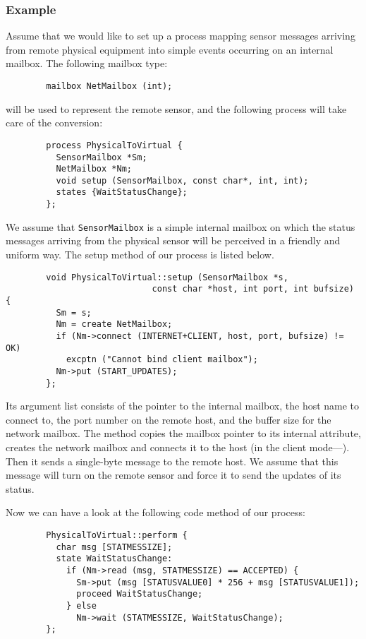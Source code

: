 \subsubsection*{Example}

\noindent
Assume that we would like to set up a process mapping sensor messages arriving
from remote physical equipment into simple events occurring
on an internal mailbox.
The following mailbox type:
\begin{verbatim}
        mailbox NetMailbox (int);
\end{verbatim}
\noindent
will be used to represent the remote sensor, and the following process will
take care of the conversion:
\begin{verbatim}
        process PhysicalToVirtual {
          SensorMailbox *Sm;
          NetMailbox *Nm;
          void setup (SensorMailbox, const char*, int, int);
          states {WaitStatusChange};
        };
\end{verbatim}

We assume that {\tt SensorMailbox} is a simple internal mailbox on which
the status messages arriving from the physical sensor will be perceived in
a friendly and uniform way.
The setup method of our process is listed below.

\begin{verbatim}
        void PhysicalToVirtual::setup (SensorMailbox *s,
                             const char *host, int port, int bufsize) {
          Sm = s;
          Nm = create NetMailbox;
          if (Nm->connect (INTERNET+CLIENT, host, port, bufsize) != OK)
            excptn ("Cannot bind client mailbox");
          Nm->put (START_UPDATES);
        };
\end{verbatim}

\noindent
Its argument list consists of the pointer to the internal mailbox,
the host name to connect to, the port number
on the remote host, and the buffer size for the network mailbox.
The method copies the mailbox pointer to its internal attribute,
creates the network mailbox and connects it to the host (in the client
mode---).
Then it sends a single-byte message to the remote host.
We assume that this message will turn on the remote sensor and
force it to send the updates of its status.

Now we can have a look at the following code method of our process:
\begin{verbatim}
        PhysicalToVirtual::perform {
          char msg [STATMESSIZE];
          state WaitStatusChange:
            if (Nm->read (msg, STATMESSIZE) == ACCEPTED) {
              Sm->put (msg [STATUSVALUE0] * 256 + msg [STATUSVALUE1]);
              proceed WaitStatusChange;
            } else
              Nm->wait (STATMESSIZE, WaitStatusChange);
        };
\end{verbatim}

